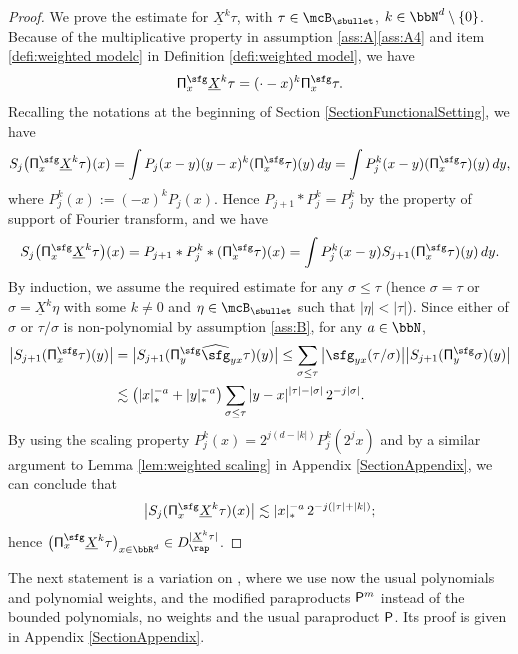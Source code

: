 \begin{proof}
We prove the estimate for $\underline{X}^k\tau$, with $\tau\in\mcB_\sbullet$, $k\in\bbN^d\setminus\{0\}$. Because of the multiplicative property in assumption \ref{ass:A}\eqref{ass:A4} and item \eqref{defi:weighted modelc} in Definition \ref{defi:weighted model}, we have
\[
{\sf\Pi}_x^{\sfg}\underline{X}^k\tau=(\cdot-x)^k{\sf\Pi}_x^{\sfg}\tau.
\]
Recalling the notations at the beginning of Section \ref{SectionFunctionalSetting}, we have
\begin{align*}
S_j\bigl({\sf\Pi}_x^{\sfg}\underline{X}^k\tau\bigr)(x)
= \int P_j(x-y)(y-x)^k({\sf\Pi}_x^{\sfg}\tau)(y)\,dy
= \int P_j^{k}(x-y)({\sf\Pi}_x^{\sfg}\tau)(y)\,dy,
\end{align*}
where $P_j^k(x):=(-x)^kP_j(x)$. Hence $P_{j+1}*P_j^k=P_j^k$ by the property of support of Fourier transform, and we have
\begin{align*}
S_j\bigl({\sf\Pi}_x^{\sfg}\underline{X}^k\tau\bigr)(x) = P_{j+1}*P_j^k*({\sf\Pi}_x^{\sfg}\tau)(x) = \int P_j^k(x-y)S_{j+1}({\sf\Pi}_x^{\sfg}\tau)(y)\,dy.
\end{align*}
By induction, we assume the required estimate for any $\sigma\le\tau$ (hence $\sigma=\tau$ or $\sigma=\underline{X}^k\eta$ with some $k\neq0$ and $\eta\in\mcB_\sbullet$ such that $|\eta|<|\tau|$).
Since either of $\sigma$ or $\tau/\sigma$ is non-polynomial by assumption \eqref{ass:B}, for any $a\in\bbN$,
\begin{align*}
\big|S_{j+1}({\sf\Pi}_x^{\sfg}\tau)(y)\big| &= \big|S_{j+1}({\sf\Pi}_y^{\sfg}\widehat{\sfg}_{yx}\tau)(y) \big|
\le\sum_{\sigma\le\tau} \big|\sfg_{yx}(\tau/\sigma)\big| \big|S_{j+1}({\sf\Pi}_y^{\sfg}\sigma)(y)\big| \\
&\lesssim \bigl(|x|_*^{-a}+|y|_*^{-a}\bigr) \sum_{\sigma\le\tau}|y-x|^{|\tau|-|\sigma|}\,2^{-j|\sigma|}.
\end{align*}
By using the scaling property $P_j^k(x)=2^{j(d-|k|)}P_j^k(2^jx)$ and by a similar argument to Lemma \ref{lem:weighted scaling} in Appendix \ref{SectionAppendix}, we can conclude that
\begin{align*}
\big|S_j({\sf\Pi}_x^{\sfg}\underline{X}^k\tau)(x)\big| \lesssim |x|_*^{-a}\,2^{-j(|\tau|+|k|)};
\end{align*}
hence $\bigl({\sf\Pi}_x^{\sfg}\underline{X}^k\tau\bigr)_{x\in\bbR^d}\in D_{\rap}^{|\underline{X}^k\tau|}$.
\end{proof}

The next statement is a variation on \cite[Prop.\,12]{BH}, where we use now the usual polynomials and polynomial weights, and the modified paraproducts ${\sf P}^m$ instead of the bounded polynomials, no weights and the usual paraproduct $\sf P$. Its proof is given in Appendix \ref{SectionAppendix}.


